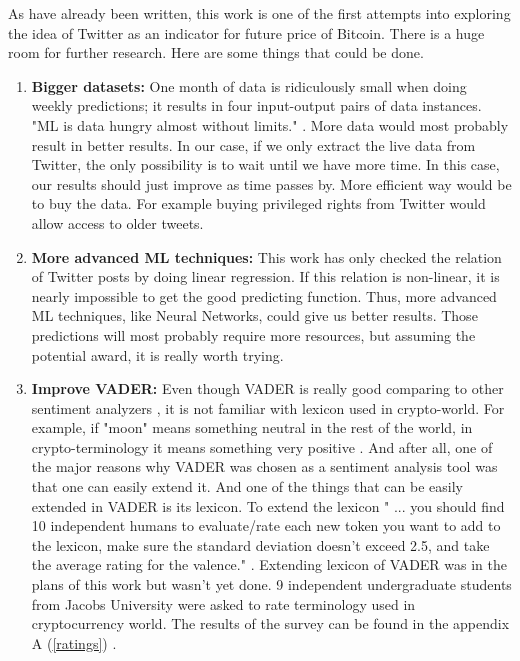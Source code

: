 \documentclass[a4paper,11pt,oneside]{article}
\begin{document}
  As have already been written, this work is one of the first attempts into exploring the idea of Twitter as an indicator for future price of Bitcoin. There is a huge room for further research. Here are some things that could be done. 
  \begin{enumerate}
  	\item {\bf Bigger datasets: } One month of data is ridiculously small when doing weekly predictions; it results in four input-output pairs of data instances. "ML is data hungry almost without limits." \cite{mllecturenotes}. More data would most probably result in better results. In our case, if we only extract the live data from Twitter, the only possibility is to wait until we have more time. In this case, our results should just improve as time passes by. More efficient way would be to buy the data. For example buying privileged rights from Twitter would allow access to older tweets. \cite{twitterstandardsearch}
  
	\item {\bf More advanced ML techniques: } This work has only checked the relation of Twitter posts by doing linear regression. If this relation is non-linear, it is nearly impossible to get the good predicting function. Thus, more advanced ML techniques, like Neural Networks, could give us better results. Those predictions will most probably require more resources, but assuming the potential award, it is really worth trying.
	
	\item {\bf Improve VADER: } Even though VADER is really good comparing to other sentiment analyzers \cite{vader}, it is not familiar with lexicon used in crypto-world. For example, if "moon" means something neutral in the rest of the world, in crypto-terminology it means something very positive \cite{cryptolexicon}. And after all, one of the major reasons why VADER was chosen as a sentiment analysis tool was that one can easily extend it. And one of the things that can be easily extended in VADER is its lexicon. To extend the lexicon " ... you should find 10 independent humans to evaluate/rate each new token you want to add to the lexicon, make sure the standard deviation doesn't exceed 2.5, and take the average rating for the valence." \cite{vadergit}. Extending lexicon of VADER was in the plans of this work but wasn't yet done. 9 independent undergraduate students from Jacobs University were asked to rate terminology used in cryptocurrency world. The results of the survey can be found in the appendix A (\ref{ratings}) .
	

\end{enumerate}
\end{document}
